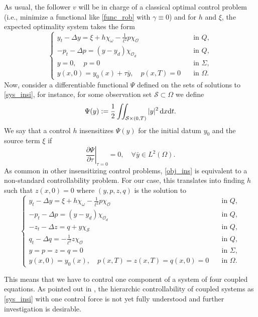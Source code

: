 \documentclass{aims}
\theoremstyle{definition}
\def\dx{\,\textnormal{d}x}
\def\dt{\textnormal{d}t}
\begin{document}
\begin{enumerate}
As usual, the follower $v$ will be in charge of a classical optimal control problem (i.e., minimize a functional like \eqref{func_rob} with $\gamma\equiv 0$) and for $h$ and $\xi$, the expected optimality system takes the form
%
\begin{equation}\label{sys_insi}
\begin{cases}
y_t-\Delta y=\xi + h\chi_{\omega}-\frac{1}{\ell^2}p\chi_{\mathcal O} &\quad\text{in }Q, \\ 
-p_t-\Delta p=(y-y_d)\chi_{\mathcal O_d} &\quad\text{in }Q, \\
y=0, \quad p=0 &\quad\text{in } \Sigma, \\
y(x,0)=y_0(x)+\tau\bar y, \quad p(x,T)=0  &\quad\text{in } \Omega.
\end{cases}
\end{equation}
%
Now, consider a differentiable functional $\Psi$ defined on the sets of solutions to \eqref{sys_insi}, for instance, for some observation set $\mathcal S\subset \Omega$ we define
%
\begin{equation*}
\Psi(y):= \frac{1}{2}\iint_{\mathcal S\times(0,T)}|y|^2\dx\dt.
\end{equation*}
%
We say that a control $h$ insensitizes $\Psi(y)$ for the initial datum $y_0$ and the source term $\xi$ if
%
\begin{equation}\label{obj_ins}
\left.\frac{\partial\Psi}{\partial\tau}\right|_{\tau=0}=0, \quad \forall \bar y\in L^2(\Omega). 
\end{equation}
%
As common in other insensitizing control problems, \eqref{obj_ins} is equivalent to a non-standard controllability problem. For our case, this translates into finding $h$ such that $z(x,0)=0$ where $(y,p,z,q)$ is the solution to
%
\begin{equation}\label{sys_insi}
\begin{cases}
y_t-\Delta y=\xi + h\chi_{\omega}-\frac{1}{\ell^2}p\chi_{\mathcal O} &\quad\text{in }Q, \\ 
-p_t-\Delta p=(y-y_d)\chi_{\mathcal O_d} &\quad\text{in }Q, \\
-z_t-\Delta z= q+y\chi_\mathcal{S} &\quad\text{in }Q, \\
q_t-\Delta q=-\frac{1}{\ell^2}z\chi_{\mathcal O} &\quad\text{in }Q, \\
y= p=z=q=0 &\quad\text{in } \Sigma, \\
y(x,0)=y_0(x), \quad p(x,T)=z(x,T)=q(x,0)=0  &\quad\text{in } \Omega.
\end{cases}
\end{equation}

This means that we have to control one component of a system of four coupled equations. As pointed out in \cite{vhs_honor}, the hierarchic controllability of coupled systems as \eqref{sys_insi} with one control force is not yet fully understood and further investigation is desirable. 
\end{enumerate} 
\end{document}
